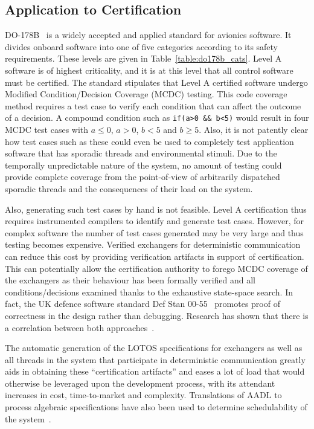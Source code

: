 \subsection{Application to Certification}
DO-178B~\cite{do178b} is a widely accepted and applied standard for
avionics software. It divides onboard software into one of five
categories according to its safety requirements. These levels are
given in Table~\ref{table:do178b_cats}. Level A software is of highest
criticality, and it is at this level that all control software must be
certified. The standard stipulates that Level A certified software
undergo Modified Condition/Decision Coverage (MCDC) testing. This code
coverage method requires a test case to verify each condition that can
affect the outcome of a decision. A compound condition such as
\texttt{if(a>0 \&\& b<5)} would result in four MCDC test cases
with $a\le 0$, $a>0$, $b<5$ and $b\ge 5$. Also, it is not patently
clear how test cases such as these could even be used to completely
test application software that has sporadic threads and environmental
stimuli. Due to the temporally unpredictable nature of the system, no
amount of testing could provide complete coverage from the
point-of-view of arbitrarily dispatched sporadic threads and the
consequences of their load on the system.

Also, generating such test cases by hand is not feasible. Level A
certification thus requires instrumented compilers to identify and
generate test cases. However, for complex software the number of test
cases generated may be very large and thus testing becomes
expensive. Verified exchangers for deterministic communication can
reduce this cost by providing verification artifacts in support of
certification. This can potentially allow the certification authority
to forego MCDC coverage of the exchangers as their behaviour has been
formally verified and all conditions/decisions examined thanks to the
exhaustive state-space search. In fact, the UK defence software
standard Def Stan 00-55~\cite{uk-def-stan} promotes proof of
correctness in the design rather than debugging. Research has shown
that there is a correlation between both
approaches~\cite{gasperoni@ae02}.

The automatic generation of the LOTOS specifications for exchangers as
well as all threads in the system that participate in deterministic
communication greatly aids in obtaining these ``certification
artifacts'' and eases a lot of load that would otherwise be leveraged
upon the development process, with its attendant increases in cost,
time-to-market and complexity. Translations of AADL to process
algebraic specifications have also been used to determine
schedulability of the system~\cite{sokolsky@ipdps06}.


